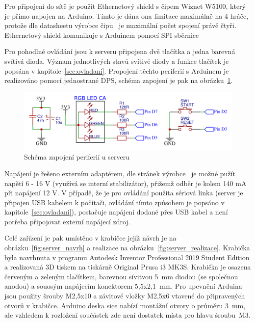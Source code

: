 Pro připojení do sítě je použit Ethernetový shield s čipem Wiznet W5100, který je přímo napojen na Arduino. Tímto je dána ona limitace maximálně na 4 hráče, protože dle datasheetu výrobce čipu~\cite{datasheet_w5100} je maximální počet spojení právě čtyři. Ethernetový shield komunikuje s Arduinem pomocí SPI sběrnice

Pro pohodlné ovládání jsou k serveru připojena dvě tlačítka a jedna barevná svítivá dioda. Význam jednotlivých stavů svítivé diody a funkce tlačítek je popsána v kapitole~\ref{sec:ovladani}. Propojení těchto periferií s Arduinem je realizováno pomocí jednostrané DPS, schéma zapojení je pak na obrázku~\ref{fig:server_module}.

\begin{figure}[hbtp]
  \centering
  \includegraphics[width=12cm]{img/server_module.png}
  \caption{\label{fig:server_module} Schéma zapojení periferií u serveru}
\end{figure}

Napájení je řešeno externím adaptérem, dle stránek výrobce~\cite{ArdDue_web} je možné pužít napětí 6 - 16 V (využívá se interní stabilizátor), přižemž odběr je kolem 140 mA při napájení 12 V. V případě, že je pro ovládání použita sériová linka (server je připojen USB kabelem k počítači, ovládání tímto způsobem je popsáno v kapitole~\ref{sec:ovladani}), postačuje napájení dodané přes USB kabel a není potřeba připojovat externí napájecí zdroj.

Celé zařízení je pak umístěno v krabičce jejíž návrh je na obrázku~\ref{fig:server_navrh} a realizace na obrázku~\ref{fig:server_realizace}. Krabička byla navrhnuta v programu Autodesk Inventor Professional 2019 Student Edition a realizovaná 3D tiskem na tiskárně Original Prusa i3 MK3S. Krabička je osazena červeným a zeleným tlačítkem, barevnou sívitvou 5~mm diodou (se společnou anodou) a souosým napájecím konektorem 5,5x2,1~mm. Pro upevnění Arduina jsou použity šrouby M2,5x10 a závitové vložky M2,5x6 vtavené do připravených otvorů v krabičce. Arduino deska sice nabízí montážní otvory o průměru 3~mm, ale vzhledem k rozložení součástek zde není dostatek místa pro hlavu šroubu~M3.

